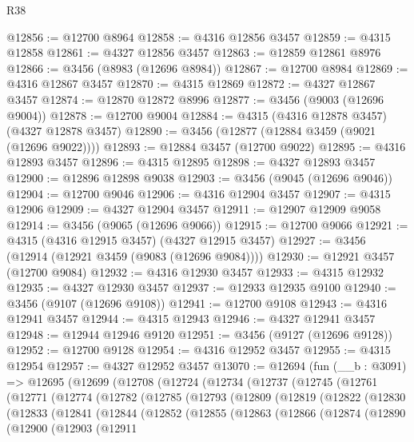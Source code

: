 \begin{lexlean}{R38}
\begin{coremodule}
@12856 := @12700 @8964
@12858 := @4316 @12856 @3457
@12859 := @4315 @12858
@12861 := @4327 @12856 @3457
@12863 := @12859 @12861 @8976
@12866 := @3456 (@8983 (@12696 @8984))
@12867 := @12700 @8984
@12869 := @4316 @12867 @3457
@12870 := @4315 @12869
@12872 := @4327 @12867 @3457
@12874 := @12870 @12872 @8996
@12877 := @3456 (@9003 (@12696 @9004))
@12878 := @12700 @9004
@12884 := @4315 (@4316 @12878 @3457) (@4327 @12878 @3457)
@12890 := @3456 (@12877 (@12884 @3459 (@9021 (@12696 @9022))))
@12893 := @12884 @3457 (@12700 @9022)
@12895 := @4316 @12893 @3457
@12896 := @4315 @12895
@12898 := @4327 @12893 @3457
@12900 := @12896 @12898 @9038
@12903 := @3456 (@9045 (@12696 @9046))
@12904 := @12700 @9046
@12906 := @4316 @12904 @3457
@12907 := @4315 @12906
@12909 := @4327 @12904 @3457
@12911 := @12907 @12909 @9058
@12914 := @3456 (@9065 (@12696 @9066))
@12915 := @12700 @9066
@12921 := @4315 (@4316 @12915 @3457) (@4327 @12915 @3457)
@12927 := @3456 (@12914 (@12921 @3459 (@9083 (@12696 @9084))))
@12930 := @12921 @3457 (@12700 @9084)
@12932 := @4316 @12930 @3457
@12933 := @4315 @12932
@12935 := @4327 @12930 @3457
@12937 := @12933 @12935 @9100
@12940 := @3456 (@9107 (@12696 @9108))
@12941 := @12700 @9108
@12943 := @4316 @12941 @3457
@12944 := @4315 @12943
@12946 := @4327 @12941 @3457
@12948 := @12944 @12946 @9120
@12951 := @3456 (@9127 (@12696 @9128))
@12952 := @12700 @9128
@12954 := @4316 @12952 @3457
@12955 := @4315 @12954
@12957 := @4327 @12952 @3457
@13070 := @12694
    (fun (__b : @3091) =>
    @12695
      (@12699
        (@12708
          (@12724
            (@12734
              (@12737
                (@12745
                  (@12761
                    (@12771
                      (@12774
                        (@12782
                          (@12785
                            (@12793
                              (@12809
                                (@12819
                                  (@12822
                                    (@12830
                                      (@12833
                                        (@12841
                                          (@12844
                                            (@12852
                                              (@12855
                                                (@12863
                                                  (@12866
                                                    (@12874
                                                      (@12890
                                                        (@12900
                                                          (@12903
                                                            (@12911

\end{coremodule}
\end{lexlean}

